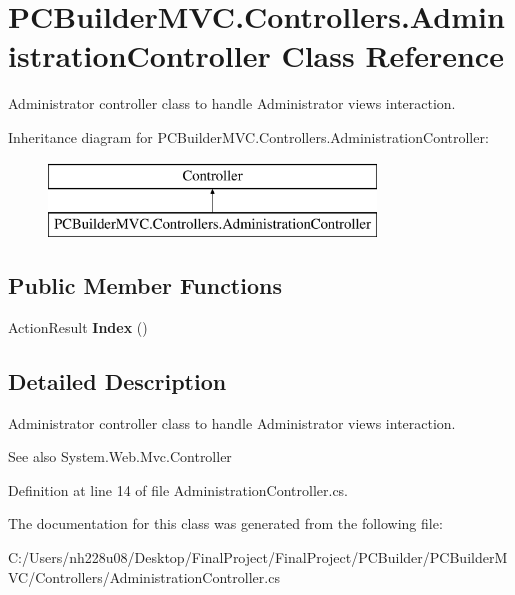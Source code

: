 \hypertarget{class_p_c_builder_m_v_c_1_1_controllers_1_1_administration_controller}{}\section{P\+C\+Builder\+M\+V\+C.\+Controllers.\+Administration\+Controller Class Reference}
\label{class_p_c_builder_m_v_c_1_1_controllers_1_1_administration_controller}


Administrator controller class to handle Administrator views interaction.  


Inheritance diagram for P\+C\+Builder\+M\+V\+C.\+Controllers.\+Administration\+Controller\+:\begin{figure}[H]
\begin{center}
\leavevmode
\includegraphics[height=2.000000cm]{class_p_c_builder_m_v_c_1_1_controllers_1_1_administration_controller}
\end{center}
\end{figure}
\subsection*{Public Member Functions}
\begin{DoxyCompactItemize}
\item 
Action\+Result {\bfseries Index} ()\hypertarget{class_p_c_builder_m_v_c_1_1_controllers_1_1_administration_controller_a7f1898706308a45f6d458613efa5365e}{}\label{class_p_c_builder_m_v_c_1_1_controllers_1_1_administration_controller_a7f1898706308a45f6d458613efa5365e}

\end{DoxyCompactItemize}


\subsection{Detailed Description}
Administrator controller class to handle Administrator views interaction. 

\begin{DoxySeeAlso}{See also}
System.\+Web.\+Mvc.\+Controller


\end{DoxySeeAlso}


Definition at line 14 of file Administration\+Controller.\+cs.



The documentation for this class was generated from the following file\+:\begin{DoxyCompactItemize}
\item 
C\+:/\+Users/nh228u08/\+Desktop/\+Final\+Project/\+Final\+Project/\+P\+C\+Builder/\+P\+C\+Builder\+M\+V\+C/\+Controllers/Administration\+Controller.\+cs\end{DoxyCompactItemize}
